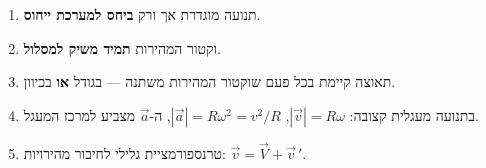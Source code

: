 \documentclass[12pt, a4paper]{article}
\newcommand{\hvec}[1]{\overrightarrow{#1}}
\begin{document}
\begin{tcolorbox}[warnbox, title={נקודות מפתח לזכור}]
\begin{enumerate}
  \item תנועה מוגדרת אך ורק \textbf{ביחס למערכת ייחוס}.
  \item וקטור המהירות \textbf{תמיד משיק למסלול}.
  \item תאוצה קיימת בכל פעם שוקטור המהירות משתנה --- בגודל \textbf{או} בכיוון.
  \item בתנועה מעגלית קצובה:
        \textenglish{$|\hvec{v}| = R\omega$},\;
        \textenglish{$|\hvec{a}| = R\omega^2 = v^2/R$},\;
        ה-\textenglish{$\hvec{a}$} מצביע למרכז המעגל.
  \item טרנספורמציית גלילי לחיבור מהירויות:
        \textenglish{$\hvec{v} = \hvec{V} + \hvec{v}\,'$}.
\end{enumerate}
\end{tcolorbox}
\end{document}
